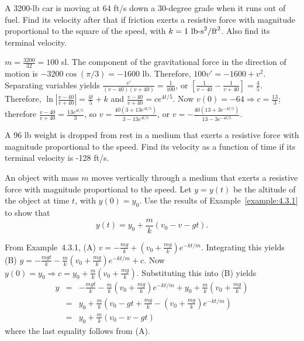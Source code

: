 \documentclass{ximera}
\begin{document}
\begin{problem}\label{exer:4.3.6}
A 3200-lb car is moving at 64 ft/s down a 30-degree grade when it
runs out of fuel. Find its velocity after that if friction exerts a
resistive force with magnitude proportional to the square of the
speed, with $k=1\ \mbox{lb-s}^2/{\mbox ft}^2$. Also find its
terminal velocity.

\begin{solution}
$m=\frac{3200}{32}=100$ sl. The
component of the gravitational force in the direction of motion is
$-3200\cos(\pi/3)=-1600$ lb. Therefore,
$100v'=-1600+v^2$. Separating variables yields
$\frac{v'}{(v-40)(v+40)}=\frac{1}{100}$, or $\left[\frac{1}{v-40}-\frac{1}{v+40}\right]=\frac{4}{5}$. Therefore,
$\ln\left|\frac{v-40}{v+40}\right|=\frac{4t}{5}+k$ and $\frac{v-40}{v+40}=ce^{4t/5}$.
Now $v(0)=-64\Rightarrow c=\frac{13}{3}$; therefore $\frac{v-40}{v+40}=\frac{13e^{4t/5}}{3}$, so
$v=\frac{40(3+13e^{4t/5})}{3-13e^{4t/5}}$, or
$v=-\frac{40(13+3e^{-4t/5})}{13-3e^{-4t/5}}$.
\end{solution}
\end{problem}

\begin{problem}\label{exer:4.3.7}
A 96 lb weight is dropped from rest in a medium that exerts a
resistive force with magnitude proportional to the speed. Find its
velocity as a function of time if its terminal velocity is -128
ft/s.
\end{problem}

\begin{problem}\label{exer:4.3.8}
An object with mass $m$ moves vertically through a medium that exerts
a resistive force with magnitude proportional to the  speed. Let
$y=y(t)$ be the
altitude of the object at time $t$, with $y(0)=y_0$. Use the results
of Example~\ref{example:4.3.1} to show that
$$
 y(t)=y_0+\frac{m}{k}(v_0-v-gt).
$$

\begin{solution}
From Example~4.3.1, (A) $v=-\frac{mg}{k}+\left(v_0+\frac{mg}{k}\right)e^{-kt/m}$. Integrating this yields
(B) $y=-\frac{mgt}{k}-\frac{m}{k}\left(v_0+\frac{mg}{k}\right)e^{-kt/m}+c$.
Now $y(0)=y_0\Rightarrow c=y_0+\frac{m}{k}\left(v_0+\frac{mg}{k}\right)$. Substituting this into (B) yields
\begin{eqnarray*}
y&=&-\frac{mgt}{k}-\frac{m}{k}\left(v_0+\frac{mg}{k}\right)e^{-kt/m}+
y_0+\frac{m}{k}\left(v_0+\frac{mg}{k}\right)\\
&=&y_0+\frac{m}{k}\left(v_0-gt+\frac{mg}{k}-\left(v_0+\frac{mg}{k}\right)e^{-kt/m}\right)\\
&=&y_0+\frac{m}{k}(v_0-v-gt)
\end{eqnarray*}
where the last equality follows from (A).
\end{solution}
\end{problem}
\end{document}
